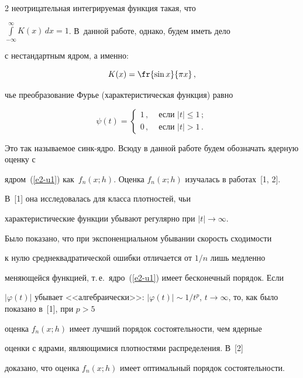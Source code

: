 \begin{multicols}{2}
неотрицательная интегрируемая функция такая, что

$\int\limits_{-\infty}^\infty K(x)\,dx=1$. В~данной работе, однако, будем иметь дело

с нестандартным ядром, а именно:

\begin{equation}

K(x)=\fr{\sin x}{\pi x}\,,

\label{e2-u1}

\end{equation}

чье преобразование Фурье (характеристическая функция) равно



\noindent

$$

\psi(t)=\begin{cases}

1\,,& \mbox{\ если\ } |t|\le 1\,;\\

0\,,& \mbox{\ если\ } |t|>1\,.

\end{cases}

$$

Это так называемое синк-ядро. Всюду в данной работе будем обозначать ядерную оценку с

ядром~(\ref{e2-u1}) как~$f_n(x;h)$. Оценка $f_n(x;h)$ изучалась в работах~[1, 2]. 

В~[1] она исследовалась для класса плотностей, чьи

характеристические функции убывают регулярно при $|t|\to\infty$.

Было показано, что при экспоненциальном убывании скорость сходимости

к нулю среднеквадратической ошибки отличается от $1/n$ лишь медленно

меняющейся функцией, т.\,е.\ ядро~(\ref{e2-u1}) имеет бесконечный порядок. Если

$|\varphi(t)|$ убывает <<алгебраически>>: $|\varphi(t)|\sim

1/{t^p}$, $t\to\infty$, то, как было показано в~[1], при $p>5$

оценка $f_n(x;h)$ имеет лучший порядок состоятельности, чем ядерные

оценки с ядрами, являющимися плотностями распределения. В~[2]

доказано, что оценка $f_n(x;h)$ имеет оптимальный порядок состоятельности.




\end{multicols}

